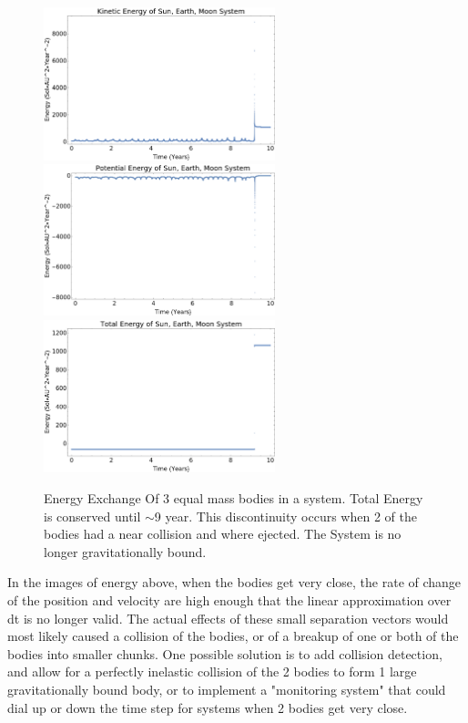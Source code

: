 \documentclass{article}
\begin{document}
\begin{figure}[!htb]
	\begin{center}
		\includegraphics[width=0.6\textwidth]{images/p2-1c.pdf}
		\includegraphics[width=0.6\textwidth]{images/p2-1d.pdf}
		\includegraphics[width=0.6\textwidth]{images/p2-1e.pdf}
	\end{center}
	\caption{Energy Exchange Of 3 equal mass bodies in a system. Total Energy is conserved until $\sim$9 year. This discontinuity occurs when 2 of the bodies had a near collision and where ejected. The System is no longer gravitationally bound.}
\label{fig:qual}
\end{figure}
\FloatBarrier

In the images of energy above, when the bodies get very close, the rate of change of the position and velocity are high enough that the linear approximation over dt is no longer valid. The actual effects of these small separation vectors would most likely caused a collision of the bodies, or of a breakup of one or both of the bodies into smaller chunks. One possible solution is to add collision detection, and allow for a perfectly inelastic collision of the 2 bodies to form 1 large gravitationally bound body, or to implement a "monitoring system" that could dial up or down the time step for systems when 2 bodies get very close.
\end{document}
